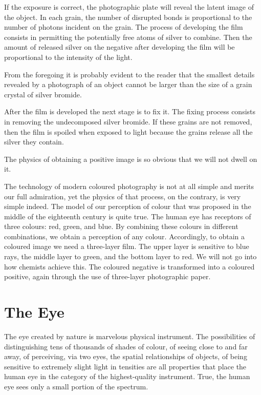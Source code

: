 If the exposure is correct, the photographic plate will reveal the latent image of the object. In each grain, the number of disrupted bonds is proportional to the number of photons incident on the grain. The process of devel­oping the film consists in permitting the potentially free atoms of silver to combine. Then the amount of released silver on the negative after developing the film will be proportional to the intensity of the light.

From the foregoing it is probably evident to the reader that the smallest details revealed by a photograph of an object cannot be larger than the size of a grain crystal of silver bromide.

After the film is developed the next stage is to fix it. The fixing process consists in removing the undecomposed silver bromide. If these grains are not removed, then the film is spoiled when exposed to light because the grains release all the silver they contain.

The physics of obtaining a positive image is so obvious that we will not dwell on it.

The technology of modern coloured photography is not at all simple and merits our full admiration, yet the physics of that process, on the contrary, is very simple indeed. The model of our perception of colour that was proposed in the middle of the eighteenth century is quite true. The human eye has receptors of three colours: red, green, and blue. By combining these colours in different combinations, we obtain a perception of any colour. Accordingly, to obtain a coloured image we need a three-layer film. The upper layer is sensitive to blue rays, the middle layer to green, and the bottom layer to red. We will not go into how chemists achieve this. The coloured negative is transformed into a coloured positive, again through the use of three-layer photographic paper.

\section{The Eye}

The eye created by nature is marvelous physical in­strument. The possibilities of distinguishing tens of thousands of shades of colour, of seeing close to and far away, of perceiving, via two eyes, the spatial relationships of objects, of being sensitive to extremely slight light in­ tensities are all properties that place the human eye in the category of the highest-quality instrument. True, the human eye sees only a small portion of the spectrum.


